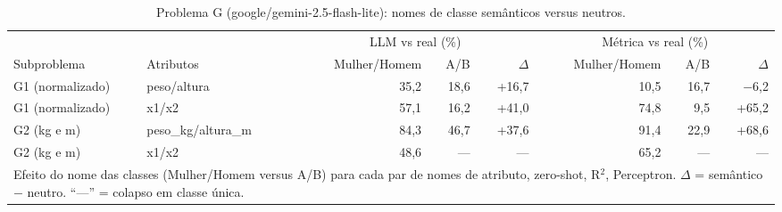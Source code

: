 \begin{table}[htbp]
\centering
\small
\caption{Problema G (google/gemini-2.5-flash-lite): nomes de classe semânticos versus neutros.}
\label{tab:bloco3_G_nomes_semanticos_vs_neutros_flashlite}
\begin{tabular}{llrrrrrr}
\toprule
 &  & \multicolumn{3}{c}{LLM vs real (\%)} & \multicolumn{3}{c}{Métrica vs real (\%)} \\ \cmidrule(lr){3-5} \cmidrule(lr){6-8}
Subproblema & Atributos & Mulher/Homem & A/B & $\Delta$ & Mulher/Homem & A/B & $\Delta$ \\
\midrule
G1 (normalizado) & peso/altura & 35,2 & 18,6 & +16,7 & 10,5 & 16,7 & $-$6,2 \\
G1 (normalizado) & x1/x2 & 57,1 & 16,2 & +41,0 & 74,8 & 9,5 & +65,2 \\
\midrule
G2 (kg e m) & peso\_kg/altura\_m & 84,3 & 46,7 & +37,6 & 91,4 & 22,9 & +68,6 \\
G2 (kg e m) & x1/x2 & 48,6 & — & — & 65,2 & — & — \\
\bottomrule
\multicolumn{8}{p{0.95\linewidth}}{\footnotesize Efeito do nome das classes (Mulher/Homem versus A/B) para cada par de nomes de atributo, zero-shot, R$^2$, Perceptron. $\Delta$ = semântico $-$ neutro. ``—'' = colapso em classe única.} \\
\end{tabular}
\end{table}

